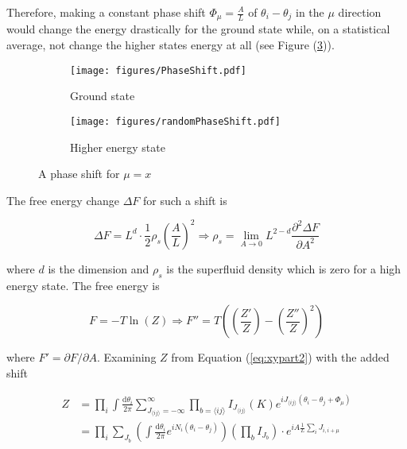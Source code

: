 Therefore, making a constant phase shift $\Phi_\mu = \frac{A}{L}$ of $\theta_i - \theta_j$ in the $\mu$ direction would change the energy drastically for the ground state while, on a statistical average, not change the higher states energy at all (see Figure (\ref{fig:xyphaseshift})).

\begin{figure}[h!]
\centering
    \begin{subfigure}{.4\textwidth}
        \centering
        \texttt{[image: figures/PhaseShift.pdf]}
        \caption{Ground state}
        \label{fig:xyground}
    \end{subfigure}
    \begin{subfigure}{.4\textwidth}
        \centering
        \texttt{[image: figures/randomPhaseShift.pdf]}
        \caption{Higher energy state}
        \label{fig:xyhigher}
    \end{subfigure}
    \caption{A phase shift for $\mu = x$}
\label{fig:xyphaseshift}
\end{figure}

The free energy change $\Delta F$ for such a shift is

\begin{equation}
    \Delta F = L^d \cdot \frac{1}{2} \rho_s \left( \frac{A}{L} \right)^2 \Rightarrow \rho_s = \lim_{A \to 0} L^{2 - d}\frac{\partial^2 \Delta F}{\partial A^2}
\end{equation}

where $d$ is the dimension and $\rho_s$ is the superfluid density which is zero for a high energy state. The free energy is

\begin{equation}
F = - T \ln(Z) \Rightarrow F'' = T \left(\left(\frac{Z'}{Z}\right) - \left( \frac{Z''}{Z} \right)^2 \right)
\label{eq:xyfreeenergy}
\end{equation}

where $F' = \partial F / \partial A$. Examining $Z$ from Equation (\ref{eq:xypart2}) with the added shift

\begin{align}
    Z &= \prod_i \int \frac{\mathrm d \theta_i}{2 \pi} \sum_{J_{\langle ij \rangle} = -\infty}^{\infty} \prod_{b = \langle ij \rangle} I_{J_{\langle ij \rangle}} ( K ) e^{i J_{\langle ij \rangle} (\theta_i - \theta_j + \Phi_\mu)} \\
%
    & = \prod_i \sum_{J_b} \left ( \int \frac{\mathrm d \theta_i}{2 \pi} e^{i N_i (\theta_i - \theta_j)} \right ) \left ( \prod_b I_{J_b} \right ) \cdot e^{i A \frac{1}{L} \sum_i J_{i, i+\mu}} \\
\label{eq:xypart3}
\end{align}

